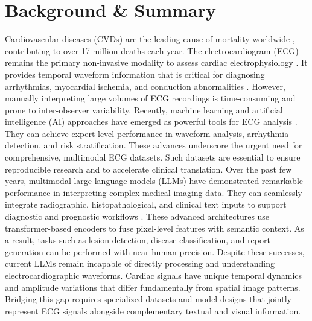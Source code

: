 \documentclass[12pt,letterpaper]{article}
\begin{document}


\section*{Background \& Summary}

Cardiovascular diseases (CVDs) are the leading cause of mortality worldwide \cite{martin20252025}, contributing to over 17 million deaths each year. The electrocardiogram (ECG) remains the primary non-invasive modality to assess cardiac electrophysiology \cite{tan2025pediatric}. It provides temporal waveform information that is critical for diagnosing arrhythmias, myocardial ischemia, and conduction abnormalities \cite{yagi2024routine, zheng202012}. However, manually interpreting large volumes of ECG recordings is time-consuming and prone to inter-observer variability. Recently, machine learning and artificial intelligence (AI) approaches have emerged as powerful tools for ECG analysis \cite{hong2020opportunities,lan2022intra,lan2024towards,li2025electrocardiogram}. They can achieve expert-level performance in waveform analysis, arrhythmia detection, and risk stratification. These advances underscore the urgent need for comprehensive, multimodal ECG datasets. Such datasets are essential to ensure reproducible research and to accelerate clinical translation. Over the past few years, multimodal large language models (LLMs) have demonstrated remarkable performance in interpreting complex medical imaging data\cite{liu2023medical}. They can seamlessly integrate radiographic, histopathological, and clinical text inputs to support diagnostic and prognostic workflows \cite{sandmann2025benchmark, zhou2025large}. These advanced architectures use transformer-based encoders to fuse pixel-level features with semantic context. As a result, tasks such as lesion detection, disease classification, and report generation can be performed with near-human precision\cite{hong2025evaluating}. Despite these successes, current LLMs remain incapable of directly processing and understanding electrocardiographic waveforms. Cardiac signals have unique temporal dynamics and amplitude variations that differ fundamentally from spatial image patterns. Bridging this gap requires specialized datasets and model designs that jointly represent ECG signals alongside complementary textual and visual information.
\end{document}
